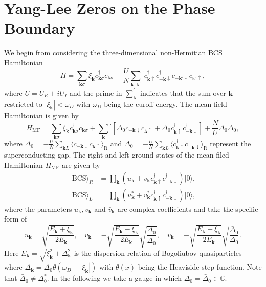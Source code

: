 \documentclass[aps,prl,twocolumn,nofootinbib,superscriptaddress,longbibliography]{revtex4-1}
\begin{document}
\section{Yang-Lee Zeros on the Phase Boundary}
We begin from considering the three-dimensional non-Hermitian BCS Hamiltonian
\begin{equation}
	H=\sum_{\boldsymbol{k}\sigma}\xi_{\boldsymbol{k}}c_{\boldsymbol{k}\sigma}^{\dagger}c_{\boldsymbol{k}\sigma}-\frac{U}{N}\sum_{\bm{k},\bm{k}'}{}^{'}c_{\bm{k}\uparrow}^{\dagger}c_{\bm{-k}\downarrow}^{\dagger}c_{\bm{-k}'\downarrow}c_{\bm{k}'\uparrow}, \label{eq:non-Hermitian}
	\end{equation}
where $U=U_R+iU_I$ and the prime in $\sum_{\bm{k}}^{'}$ indicates that the sum over $\bm{k}$ restricted to  $|\xi_{\boldsymbol{k}}|<\omega_D$ with $\omega_D$ being the curoff energy. The mean-field Hamiltonian is given by 
\begin{equation}
H_{\mathrm{MF}}=\sum_{\boldsymbol{k}\sigma}\xi_{\boldsymbol{k}}c_{\boldsymbol{k}\sigma}^{\dagger}c_{\boldsymbol{k}\sigma}+\sum_{\bm{k}}{}^{'}[\bar{\Delta}_0c_{-\bm{k}\downarrow}c_{\bm{k}\uparrow}+\Delta_0 c_{\bm{k}\uparrow}^{\dagger}c_{-\bm{k}\downarrow}^{\dagger}]+\frac{N}{U}\bar{\Delta}_{0}\Delta_{0},
\end{equation}
 where $\Delta_{0}=-\frac{U}{N}\sum_{\boldsymbol{k}L}\langle c_{-\boldsymbol{k}\downarrow}c_{\boldsymbol{k}\uparrow}\rangle_{\mathrm{R}}$ and $\bar{\Delta}_0=-\frac{U}{N}\sum_{\boldsymbol{k}L}\langle c^{\dagger}_{\boldsymbol{k}\uparrow}c^{\dagger}_{-\boldsymbol{k}\downarrow}\rangle_{\mathrm{R}}$ represent the superconducting gap. The right and left ground states of the mean-filed Hamiltonian $H_{\mathrm{MF}}$ are given by \cite{Yamamoto2019}
\begin{align}
	|\text{BCS}\rangle_{R}&=\prod_{\bm{k}}(u_{\bm{k}}+v_{\bm{k}}c_{\boldsymbol{k}\uparrow}^{\dagger}c_{-\boldsymbol{k}\downarrow}^{\dagger})|0\rangle,\\
	|\text{BCS}\rangle_{L}&=\prod_{\bm{k}}(u^{*}_{\bm{k}}+\bar{v}^{*}_{\bm{k}}c_{\boldsymbol{k}\uparrow}^{\dagger}c_{-\boldsymbol{k}\downarrow}^{\dagger})|0\rangle,
\end{align}
where the parameters $u_{\bm{k}},v_{\bm{k}}$ and $\bar{v}_{\bm{k}}$ are complex coefficients and take the specific form of
\begin{equation}
	u_{\bm{k}}=\sqrt{\frac{E_{\bm{k}}+\xi_{\bm{k}}}{2E_{\bm{k}}}},\quad v_{\bm{k}}=-\sqrt{\frac{E_{\bm{k}}-\xi_{\bm{k}}}{2E_{\bm{k}}}}\sqrt{\frac{\Delta_0}{\bar{\Delta}_0}},\quad
	\bar{v}_{\bm{k}}=-\sqrt{\frac{E_{\bm{k}}-\xi_{\bm{k}}}{2E_{\bm{k}}}}\sqrt{\frac{\bar{\Delta}_0}{\Delta_0}}.
\end{equation}
Here $E_{\bm{k}}=\sqrt{\xi_{\bm{k}}^2+\Delta_{\bm{k}}^2}$ is the dispersion relation of Bogoliubov quasiparticles where $\Delta_{\bm{k}}=\Delta_0\theta(\omega_D-|\xi_{\bm{k}}|)$ with $\theta(x)$ being the Heaviside step function. Note that $\bar{\Delta}_0\neq\Delta_0^*$. In the following we take a gauge  \cite{Yamamoto2019} in which $\Delta_0=\bar{\Delta}_0\in\mathbb{C}$.
\end{document}
